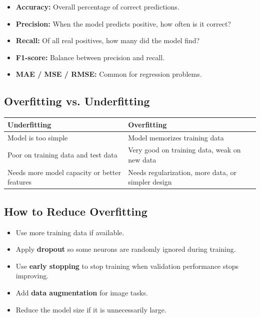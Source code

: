 \documentclass[11pt,a4paper]{article}
\begin{document}
\begin{itemize}[leftmargin=*]
  \item \textbf{Accuracy:} Overall percentage of correct predictions.
  \item \textbf{Precision:} When the model predicts positive, how often is it correct?
  \item \textbf{Recall:} Of all real positives, how many did the model find?
  \item \textbf{F1-score:} Balance between precision and recall.
  \item \textbf{MAE / MSE / RMSE:} Common for regression problems.
\end{itemize}

\subsection{Overfitting vs. Underfitting}

\begin{center}
\begin{tabular}{@{}p{6.4cm}p{6.4cm}@{}}
\toprule
\textbf{Underfitting} & \textbf{Overfitting} \\
\midrule
Model is too simple & Model memorizes training data \\
Poor on training data and test data & Very good on training data, weak on new data \\
Needs more model capacity or better features & Needs regularization, more data, or simpler design \\
\bottomrule
\end{tabular}
\end{center}

\subsection{How to Reduce Overfitting}

\begin{itemize}[leftmargin=*]
  \item Use more training data if available.
  \item Apply \textbf{dropout} so some neurons are randomly ignored during training.
  \item Use \textbf{early stopping} to stop training when validation performance stops improving.
  \item Add \textbf{data augmentation} for image tasks.
  \item Reduce the model size if it is unnecessarily large.
\end{itemize}
\end{document}
